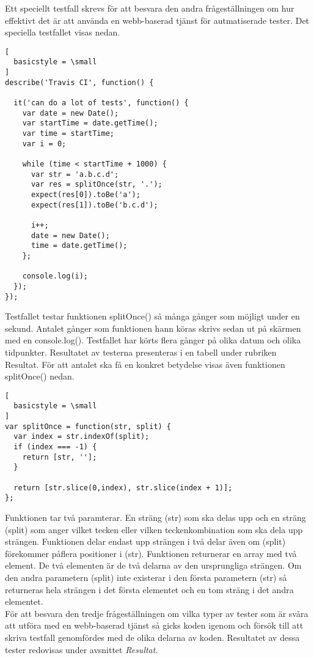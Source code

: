 Ett speciellt testfall skrevs
för att besvara den andra frågeställningen om hur effektivt det är 
att använda en webb-baserad tjänst
för autmatiserade tester. Det speciella testfallet visas nedan.

\begin{lstlisting}[
  basicstyle = \small
]
describe('Travis CI', function() {
	
  it('can do a lot of tests', function() {
    var date = new Date();
    var startTime = date.getTime();
    var time = startTime;
    var i = 0;

    while (time < startTime + 1000) {  
      var str = 'a.b.c.d';
      var res = splitOnce(str, '.');
      expect(res[0]).toBe('a');
      expect(res[1]).toBe('b.c.d');

      i++;
      date = new Date(); 
      time = date.getTime();
    };

    console.log(i);
  });
});
\end{lstlisting}

Testfallet testar funktionen splitOnce() så många gånger som möjligt
under en sekund. Antalet gånger som funktionen hann köras skrivs
sedan ut på skärmen med en console.log(). 
Testfallet har körts flera gånger på olika datum och olika tidpunkter.
Resultatet av testerna presenteras i en tabell under rubriken Resultat.
För att antalet ska
få en konkret betydelse visas även funktionen splitOnce() nedan.

\begin{lstlisting}[
  basicstyle = \small
]
var splitOnce = function(str, split) {
  var index = str.indexOf(split);
  if (index === -1) {
    return [str, ''];
  }

  return [str.slice(0,index), str.slice(index + 1)];
};
\end{lstlisting}

Funktionen tar två paramterar. En sträng (str) som ska delas upp och 
en sträng (split) som anger vilket tecken eller vilken teckenkombination
som ska dela upp strängen. Funktionen delar endast upp strängen i två delar
även om (split) förekommer påflera positioner i (str). Funktionen returnerar 
en array med två element.
De två elementen är de två delarna av den ursprungliga strängen. Om den andra
parametern (split) inte existerar i den första parametern (str) så returneras
hela strängen i det första elementet och en tom sträng i det andra elementet.\\

För att besvara den tredje frågeställningen om vilka typer av tester som är 
svåra att utföra med en webb-baserad tjänst så gicks koden igenom och 
försök till att skriva testfall genomfördes
med de olika delarna av koden. Resultatet av dessa tester redovisas under 
avsnittet \emph{Resultat}.

